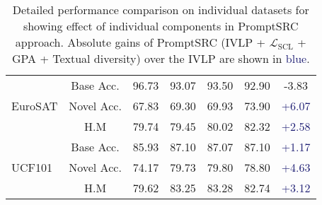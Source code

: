 \documentclass[10pt,twocolumn,letterpaper]{article}
\begin{document}
\begin{table*}[!t]
{\begin{tabular}{lc|cccc|c}
\midrule
\multirow{3}{*}{EuroSAT}       & Base Acc.       & 96.73 & 93.07    & 93.50  &92.90 &  \textcolor{Bittersweet}{{-3.83}}\\
                               & Novel Acc.      & 67.83 & 69.30    & 69.93& 73.90   & \textcolor{MidnightBlue}{{+6.07}}\\
                               & H.M            & 79.74 & 79.45    & 80.02& 82.32   &  \textcolor{MidnightBlue}{{+2.58}}\\
\midrule
\multirow{3}{*}{UCF101}        & Base Acc.      & 85.93  & 87.10   & 87.07  &87.10   & \textcolor{MidnightBlue}{{+1.17}}\\
                               & Novel Acc.      & 74.17  & 79.73   & 79.80  &78.80  &  \textcolor{MidnightBlue}{{+4.63}}\\
                               & H.M            & 79.62  & 83.25   & 83.28 &82.74  & \textcolor{MidnightBlue}{{+3.12}}\\
\bottomrule
\end{tabular}}
    \caption{\small Detailed performance comparison on individual datasets for showing effect of individual components in PromptSRC approach. Absolute gains of PromptSRC (IVLP + $\mathcal{L}_\text{SCL}$ + GPA + Textual diversity) over the IVLP are shown in \textcolor{MidnightBlue}{blue}. }
    \label{tab_appendix:base_to_new}
\end{table*}
\end{document}
